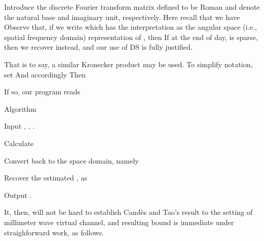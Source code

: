 \stopsection
\startsection [title={Working in the Angular Space}]

Introduce the discrete Fourier transform matrix  defined to be
Roman  and  denote the natural base and imaginary unit, respectively.
Here recall that we have
Observe that, if we write
which has the interpretation as the angular space (i.e., spatial frequency domain) representation of , then
If at the end of day,  is sparse, then we recover  instead, and our use of DS is fully justified.

That is to say, a similar Kronecker product may be used.
To simplify notation, set
And accordingly
Then

\stopsection
\startsection [title={Proposed Method}]

If so, our program reads

\Result
{Algorithm}
{
\startitemize[n]
\item Input , , .
\item Calculate
\item Convert  back to the space domain, namely
\item Recover the estimated , as
\item Output .
\stopitemize
}

It, then, will not be hard to establish Cand\`es and Tao's result to the setting of millimeter wave virtual channel, and resulting bound is immediate under straighforward work, as follows.

\stopsection
\stopchapter
